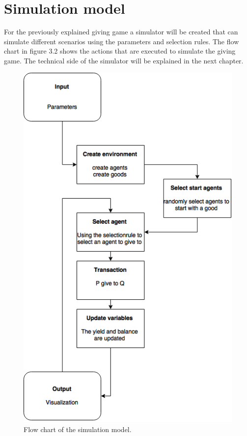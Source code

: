 \documentclass[twoside,openright]{uva-bachelor-thesis}
\begin{document}
\section{Simulation model}
For the previously explained giving game a simulator will be created that can simulate different scenarios using the parameters and selection rules. The flow chart in figure 3.2 shows the actions that are executed to simulate the giving game. The technical side of the simulator will be explained in the next chapter. 
\begin{figure}[h!]
\centering
\includegraphics[scale=0.6]{FlowChart/FlowChart}
\caption{Flow chart of the simulation model.}
\end{figure}
\end{document}
